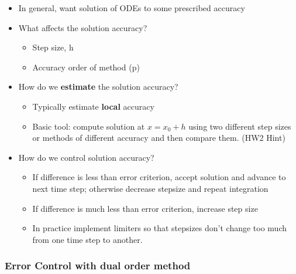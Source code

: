 \begin{itemize}
    \item In general, want solution of ODEs to some prescribed accuracy

    \item What affects the solution accuracy?

    \begin{itemize}
        \item Step size, h
        \item Accuracy order of method (p)
    \end{itemize}

    \item How do we \textbf{estimate} the solution accuracy?

    \begin{itemize}
        \item Typically estimate \textbf{local} accuracy 
        \item Basic tool: compute solution at $x=x_0+h$ using two different step sizes or methods of different accuracy and then compare them. (HW2 Hint)
    \end{itemize}

    \item How do we control solution accuracy?
    \begin{itemize}
        \item If difference is less than error criterion, accept solution and advance to next time step; otherwise decrease stepsize and repeat integration
        \item If difference is much less than error criterion, increase step size
        \item In practice implement limiters so that stepsizes don't change too much from one time step to another.
    \end{itemize}
\end{itemize}

\subsubsection{Error Control with dual order method}

